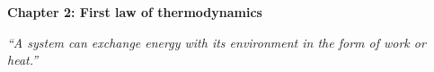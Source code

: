 \renewcommand{\theequation}{2.\arabic{equation}}

\begin{frame}
\begin{center}
{\bf Chapter 2: First law of thermodynamics}\\
\end{center}

\scriptsize

\vspace*{3cm}

\begin{center}
\textit{``A system can exchange energy with its environment in the form of work or heat.''}
\end{center}

\end{frame}

\scriptsize














